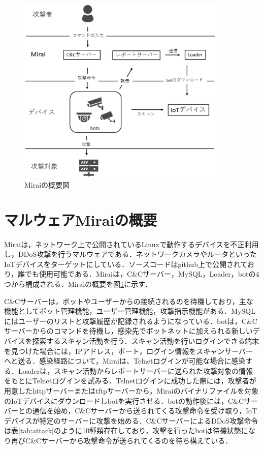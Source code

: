 \begin{figure}[h]
   \centering
      \includegraphics[width=100mm]{figures/s.eps}
      \caption{Miraiの概要図}
   \label{fig:Mirai_system}   
\end{figure}

 

\section{マルウェアMiraiの概要}

Mirai\cite{Mirai}は，ネットワーク上で公開されているLinuxで動作するデバイスを不正利用し，DDoS攻撃を行うマルウェアである．ネットワークカメラやルータといったIoTデバイスをターゲットにしている．ソースコードはgithub\cite{github}上で公開されており，誰でも使用可能である．Miraiは，C\&Cサーバー，MySQL，Loader，botの4つから構成される．Miraiの概要を図\ref{fig:Mirai_system}に示す．


C\&Cサーバーは，ボットやユーザーからの接続されるのを待機しており，主な機能としてボット管理機能，ユーザー管理機能，攻撃指示機能がある．MySQLにはユーザーのリストと攻撃履歴が記録されるようになっている．botは，C\&Cサーバーからのコマンドを待機し，感染先でボットネットに加えられる新しいデバイスを探索するスキャン活動を行う．スキャン活動を行いログインできる端末を見つけた場合には，IPアドレス，ポート，ログイン情報をスキャンサーバーへと送る．感染経路について，Miraiは、Telnetログインが可能な場合に感染する．Loaderは，スキャン活動からレポートサーバーに送られた攻撃対象の情報をもとにTelnetログインを試みる．Telnetログインに成功した際には，攻撃者が用意したhttpサーバーまたはtftpサーバーから，Miraiのバイナリファイルを対象のIoTデバイスにダウンロードしbotを実行させる．botの動作後には，C\&Cサーバーとの通信を始め，C\&Cサーバーから送られてくる攻撃命令を受け取り，IoTデバイスが特定のサーバーに攻撃を始める．C\&CサーバーによるDDoS攻撃命令は表\ref{tab:attack}のように10種類存在しており，攻撃を行ったbotは待機状態になり再びC\&Cサーバーから攻撃命令が送られてくるのを待ち構えている．

